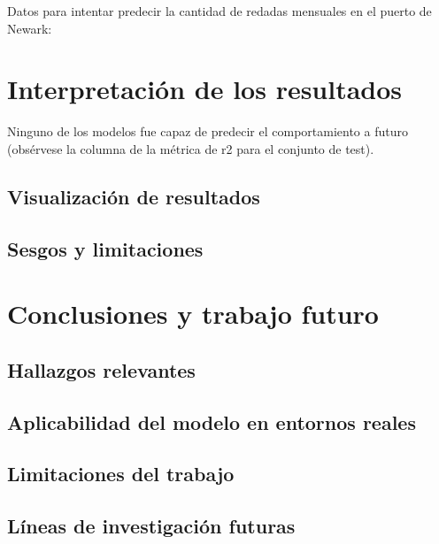 \documentclass[12pt]{article}
\begin{document}
	Datos para intentar predecir la cantidad de redadas mensuales en el puerto de Newark:
	

\newpage
\section{\label{interpretacion}Interpretación de los resultados}
Ninguno de los modelos fue capaz de predecir el comportamiento a futuro (obsérvese la columna de la métrica de r2 para el conjunto de test).

	\subsection{Visualización de resultados}
	
	
	\subsection{Sesgos y limitaciones}

\newpage
\section{\label{trabajo futuro}Conclusiones y trabajo futuro}

	\subsection{Hallazgos relevantes}
	
	\subsection{Aplicabilidad del modelo en entornos reales}
	
	\subsection{Limitaciones del trabajo}
	
	\subsection{Líneas de investigación futuras}

\newpage



\newpage
\end{document}
